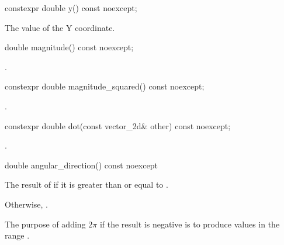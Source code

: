 \begin{itemdecl}
constexpr double y() const noexcept;
\end{itemdecl}
\begin{itemdescr}
\pnum
\returns
The value of the Y coordinate.
\end{itemdescr}

\begin{itemdecl}
    double magnitude() const noexcept;
\end{itemdecl}
\begin{itemdescr}
\pnum
\returns
{}.
\end{itemdescr}

\begin{itemdecl}
constexpr double magnitude_squared() const noexcept;
\end{itemdecl}
\begin{itemdescr}
\pnum
\returns
{}.
\end{itemdescr}

\begin{itemdecl}
constexpr double dot(const vector_2d& other) const noexcept;
\end{itemdecl}
\begin{itemdescr}
\pnum
\returns
{}.
\end{itemdescr}

\begin{itemdecl}
double angular_direction() const noexcept
\end{itemdecl}
\begin{itemdescr}
\pnum
\returns
The result of  if it is greater than or equal to .

\pnum
Otherwise, . 

\pnum
\realnotes
The purpose of adding $2\pi$ if the result is negative is to produce values in the range .
\end{itemdescr}

